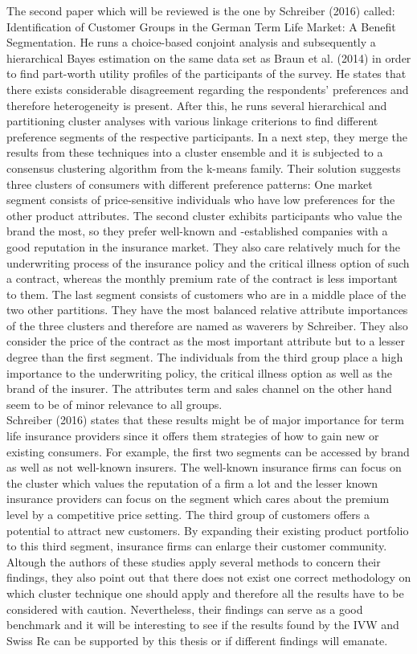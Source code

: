 \documentclass[12pt, abstracton]{article}
\begin{document}
The second paper which will be reviewed is the one by Schreiber (2016) called: Identification of Customer Groups in the German Term Life Market: A Benefit Segmentation. He runs a choice-based conjoint analysis and subsequently a hierarchical Bayes estimation on the same data set as Braun et al. (2014) in order to find part-worth utility profiles of the participants of the survey. He states that there exists considerable disagreement regarding the respondents’ preferences and therefore heterogeneity is present. After this, he runs several hierarchical and partitioning cluster analyses with various linkage criterions to find different preference segments of the respective participants. In a next step, they merge the results from these techniques into a cluster ensemble and it is subjected to a consensus clustering algorithm from the k-means family. Their solution suggests three clusters of consumers with different preference patterns: One market segment consists of price-sensitive individuals who have low preferences for the other product attributes. The second cluster exhibits participants who value the brand the most, so they prefer well-known and -established companies with a good reputation in the insurance market. They also care relatively much for the underwriting process of the insurance policy and the critical illness option of such a contract, whereas the monthly premium rate of the contract is less important to them. The last segment consists of customers who are in a middle place of the two other partitions. They have the most balanced relative attribute importances of the three clusters and therefore are named as waverers by Schreiber. They also consider the price of the contract as the most important attribute but to a lesser degree than the first segment. The individuals from the third group place a high importance to the underwriting policy, the critical illness option as well as the brand of the insurer. The attributes term and sales channel on the other hand seem to be of minor relevance to all groups.\\
Schreiber (2016) states that these results might be of major importance for term life insurance providers since it offers them strategies of how to gain new or existing consumers. For example, the first two segments can be accessed by brand as well as not well-known insurers. The well-known insurance firms can focus on the cluster which values the reputation of a firm a lot and the lesser known insurance providers can focus on the segment which cares about the premium level by a competitive price setting. The third group of customers offers a potential to attract new customers. By expanding their existing product portfolio to this third segment, insurance firms can enlarge their customer community. \\
Altough the authors of these studies apply several methods to concern their findings, they also point out that there does not exist one correct methodology on which cluster technique one should apply and therefore all the results have to be considered with caution. Nevertheless, their findings can serve as a good benchmark and it will be interesting to see if the results found by the IVW and Swiss Re can be supported by this thesis or if different findings will emanate.
\cleardoublepage
\onehalfspacing
\end{document}

